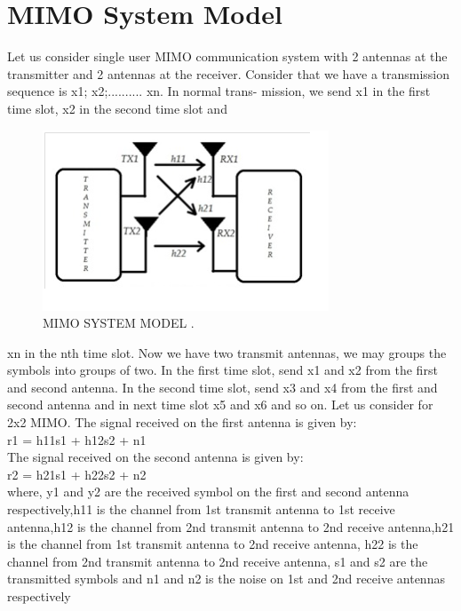 \documentclass[12pt]{report}
\begin{document}
\section*{MIMO System Model}
Let us consider single user MIMO communication system with 2 antennas at the transmitter and 2 antennas at the receiver. Consider that
we have a transmission sequence is x1; x2;.......... xn. In normal trans-
mission, we send x1 in the first time slot, x2 in the second time slot and
\begin{figure}[!hbt]
		\begin{center}
		\includegraphics[width=\columnwidth]{mimosys}
		\caption{ MIMO SYSTEM MODEL .}
		\label{fig:tf_plot}
		\end{center}
	\end{figure}
xn in the nth time slot. Now we have two transmit antennas, we may
groups the symbols into groups of two. In the first time slot, send x1
and x2 from the first and second antenna. In the second time slot,
send x3 and x4 from the first and second antenna and in next time slot
x5 and x6 and so on. Let us consider for 2x2 MIMO. The signal received
on the first antenna is given by:\\
r1 = h11s1 + h12s2 + n1 \\
The signal received on the second antenna is given by:\\
r2 = h21s1 + h22s2 + n2\\
where, y1 and y2 are the received symbol on the first and second antenna respectively,h11 is the channel from 1st transmit antenna to 1st
receive antenna,h12 is the channel from 2nd transmit antenna to 2nd
receive antenna,h21 is the channel from 1st transmit antenna to 2nd
receive antenna, h22 is the channel from 2nd transmit antenna to 2nd
receive antenna, s1 and s2 are the transmitted symbols and n1 and n2
is the noise on 1st and 2nd receive antennas respectively\\\\\\
\end{document}
